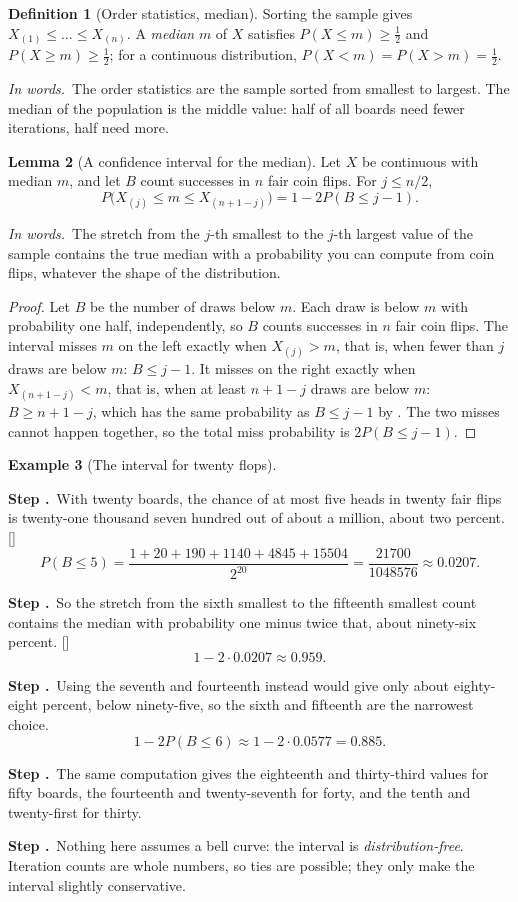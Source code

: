 \documentclass[11pt]{article}
\theoremstyle{definition}
\newtheorem{definition}{Definition}[section]
\newtheorem{example}[definition]{Example}
\newtheorem{lemma}[definition]{Lemma}
\newcommand{\inwords}{\par\smallskip\noindent\textit{In words.}\ }
\newcounter{stp}
\newcommand{\steps}{\setcounter{stp}{0}}
\newcommand{\st}{\stepcounter{stp}\par\medskip\noindent\textbf{Step \arabic{stp}.}\ }
\newcommand{\by}[1]{\hfill{\small\color{blue!50!black}[#1]}}
\begin{document}
\begin{definition}[Order statistics, median]\label{def:order}
Sorting the sample gives $X_{(1)}\le\dots\le X_{(n)}$. A \emph{median} $m$ of $X$ satisfies $P(X\le m)\ge\frac12$ and $P(X\ge m)\ge\frac12$;
for a continuous distribution, $P(X<m)=P(X>m)=\frac12$.
\inwords The order statistics are the sample sorted from smallest to largest. The median of the population is the middle
value: half of all boards need fewer iterations, half need more.
\end{definition}

\begin{lemma}[A confidence interval for the median]\label{lem:medci}
Let $X$ be continuous with median $m$, and let $B$ count successes in $n$ fair coin flips. For $j\le n/2$,
\[ P\big(X_{(j)}\le m\le X_{(n+1-j)}\big)=1-2P(B\le j-1). \]
\inwords The stretch from the $j$-th smallest to the $j$-th largest value of the sample contains the true median with a
probability you can compute from coin flips, whatever the shape of the distribution.
\end{lemma}
\begin{proof}
Let $B$ be the number of draws below $m$. Each draw is below $m$ with probability one half, independently, so $B$ counts
successes in $n$ fair coin flips. The interval misses $m$ on the left exactly when $X_{(j)}>m$, that is, when fewer than $j$
draws are below $m$: $B\le j-1$. It misses on the right exactly when $X_{(n+1-j)}<m$, that is, when at least $n+1-j$ draws are
below $m$: $B\ge n+1-j$, which has the same probability as $B\le j-1$ by . The two misses cannot happen
together, so the total miss probability is $2P(B\le j-1)$.
\end{proof}

\begin{example}[The interval for twenty flops]\label{ex:medci}
\steps
\st With twenty boards, the chance of at most five heads in twenty fair flips is twenty-one thousand seven hundred out of
about a million, about two percent. \by{}
\[ P(B\le5)=\frac{1+20+190+1140+4845+15504}{2^{20}}=\frac{21700}{1048576}\approx0.0207. \]
\st So the stretch from the sixth smallest to the fifteenth smallest count contains the median with probability one minus
twice that, about ninety-six percent. \by{}
\[ 1-2\cdot0.0207\approx0.959. \]
\st Using the seventh and fourteenth instead would give only about eighty-eight percent, below ninety-five, so the sixth
and fifteenth are the narrowest choice.
\[ 1-2P(B\le6)\approx1-2\cdot0.0577=0.885. \]
\st The same computation gives the eighteenth and thirty-third values for fifty boards, the fourteenth and twenty-seventh
for forty, and the tenth and twenty-first for thirty.
\st Nothing here assumes a bell curve: the interval is \emph{distribution-free}. Iteration counts are whole numbers, so
ties are possible; they only make the interval slightly conservative.
\end{example}
\end{document}
